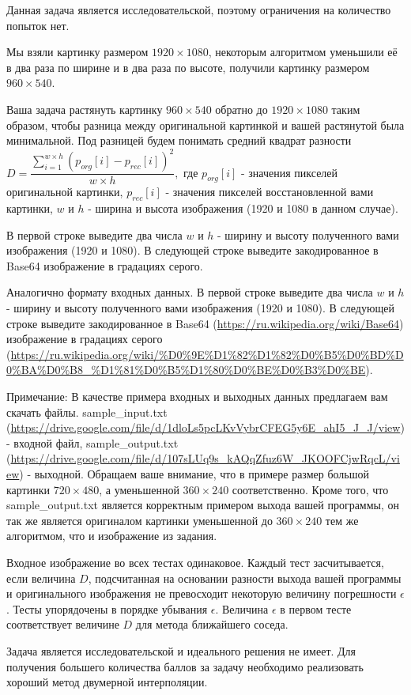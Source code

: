 
Данная задача является исследовательской, поэтому ограничения на количество попыток нет.

Мы взяли картинку размером $1920\times1080$, некоторым алгоритмом уменьшили её в два раза по ширине 
и в два раза по высоте, получили картинку размером $ 960\times540 $. 

Ваша задача растянуть картинку $ 960\times540 $ обратно до $ 1920\times1080 $ таким образом, 
чтобы разница между оригинальной картинкой и вашей растянутой была минимальной. Под разницей 
будем понимать средний квадрат разности $ D=\dfrac{\sum\limits_{i=1}^{w\times h} (p_{org}[i] - p_{rec}[i])^2}{w\times h},$ 
где $ p_{org}[i]$ - значения пикселей оригинальной картинки, $ p_{rec}[i] $ - значения пикселей восстановленной вами картинки, $ w $ и $ h $
- ширина и высота изображения (1920 и 1080 в данном случае).


В первой строке выведите два числа $ w $ и $ h $ - ширину и высоту полученного вами изображения 
(1920 и 1080). В следующей строке выведите закодированное в Base64 изображение в градациях серого.

\outputfmtSection

Аналогично формату входных данных. В первой строке выведите два числа $ w $ и $ h $ - ширину и высоту 
полученного вами изображения (1920 и 1080). В следующей строке выведите закодированное в 
Base64 (\url{https://ru.wikipedia.org/wiki/Base64}) изображение в градациях серого (\url{https://ru.wikipedia.org/wiki/%D0%9E%D1%82%D1%82%D0%B5%D0%BD%D0%BA%D0%B8_%D1%81%D0%B5%D1%80%D0%BE%D0%B3%D0%BE}).

Примечание: В качестве примера входных и выходных данных предлагаем вам скачать файлы. sample\_input.txt 
(\url{https://drive.google.com/file/d/1dloLs5pcLKvVybrCFEG5y6E_ahI5_J_J/view}) - 
входной файл, sample\_output.txt (\url{https://drive.google.com/file/d/107sLUq9s_kAQqZfuz6W_JKOOFCjwRqcL/view}) - выходной. 
Обращаем ваше внимание, что в примере размер большой картинки $720 \times 480$, 
а уменьшенной $360\times 240$ соответственно. Кроме того, что sample\_output.txt является 
корректным примером выхода вашей программы, он так же является оригиналом картинки уменьшенной до $360\times 240$ тем же алгоритмом, 
что и изображение из задания.

Входное изображение во всех тестах одинаковое. Каждый тест засчитывается, если величина $D$, подсчитанная на основании разности 
выхода вашей программы и оригинального изображения не превосходит некоторую величину погрешности $\epsilon$. Тесты упорядочены в порядке 
убывания $\epsilon$. Величина $\epsilon$ в первом тесте соответствует величине $D$ для метода ближайшего соседа.

\solutionSection

Задача является исследовательской и идеального решения не имеет. Для получения большего количества баллов за задачу необходимо реализовать хороший метод двумерной интерполяции. 